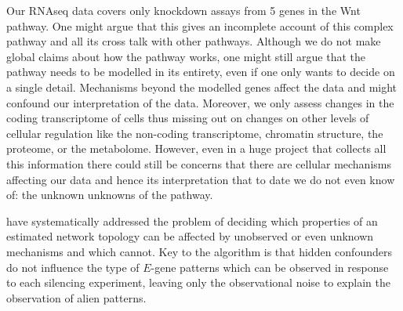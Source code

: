 Our RNAseq data covers only knockdown assays from 5 genes in the Wnt pathway. One might argue that this gives an incomplete account of this complex pathway and all its cross talk with other pathways. Although we do not make global claims about how the pathway works, one might still argue that the pathway needs to be modelled in its entirety, even if one only wants to decide on a single detail. Mechanisms beyond the modelled genes affect the data and might confound our interpretation of the data. Moreover, we only assess changes in the coding transcriptome of cells thus missing out on changes on other levels of cellular regulation like the non-coding transcriptome, chromatin structure, the proteome, or the metabolome. However, even in a huge project that collects all this information there could still be concerns that there are cellular mechanisms affecting our data and hence its interpretation that to date we do not even know of: the unknown unknowns of the pathway.

\cite{art:SadehMS2013} have systematically addressed the problem of deciding which properties of an estimated network topology can be affected by unobserved or even unknown mechanisms and which cannot. Key to the algorithm is that hidden confounders do not influence the type of $E$-gene patterns which can be observed in response to each silencing experiment, leaving only the observational noise to explain the observation of alien patterns. 

